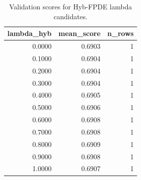 \begin{table}[t]
\caption{Validation scores for Hyb-FPDE lambda candidates.}
\label{tab:lambda_distribution_computed}
\centering
\begin{tabular}{rrr}
\toprule
lambda\_hyb & mean\_score & n\_rows \\
\midrule
0.0000 & 0.6903 & 1 \\
0.1000 & 0.6904 & 1 \\
0.2000 & 0.6904 & 1 \\
0.3000 & 0.6904 & 1 \\
0.4000 & 0.6905 & 1 \\
0.5000 & 0.6906 & 1 \\
0.6000 & 0.6908 & 1 \\
0.7000 & 0.6908 & 1 \\
0.8000 & 0.6909 & 1 \\
0.9000 & 0.6908 & 1 \\
1.0000 & 0.6907 & 1 \\
\bottomrule
\end{tabular}

\end{table}
